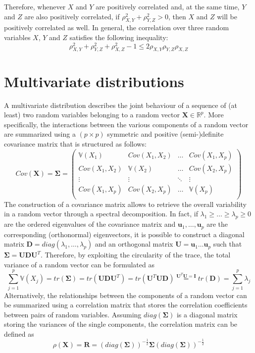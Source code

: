 \documentclass{report}
\begin{document}
\noindent Therefore, whenever $\displaystyle X$ and $\displaystyle Y$ are positively correlated and, at the same time, $\displaystyle Y$ and $\displaystyle Z$ are also positively correlated, if $\displaystyle \rho_{X, Y}^2 + \rho_{Y, Z}^2 > 0$, then $\displaystyle X$ and $\displaystyle Z$ will be positively correlated as well. \newline
In general, the correlation over three random variables $\displaystyle X$, $\displaystyle Y$ and $\displaystyle Z$ satisfies the following inequality:
\[\rho_{X, Y}^2 + \rho_{Y, Z}^2 + \rho_{X, Z}^2 - 1 \leq 2\rho_{X, Y}\rho_{Y, Z}\rho_{X, Z}\]
\section{Multivariate distributions}
A multivariate distribution describes the joint behaviour of a sequence of (at least) two random variables belonging to a random vector $\displaystyle \mathbf{X} \in \mathbb{R}^p$. \newline
More specifically, the interactions between the various components of a random vector are summarized using a $\displaystyle (p \times p)$ symmetric and positive (semi-)definite covariance matrix that is structured as follows:
\[Cov(\mathbf{X}) = \mathbf{\Sigma} = \begin{pmatrix}
    \mathbb{V}(X_1) & Cov(X_1, X_2) & \dots & Cov(X_1, X_p) \\
    Cov(X_1, X_2) & \mathbb{V}(X_2) & \dots & Cov(X_2, X_p) \\
    \vdots & \vdots & \ddots & \vdots \\
    Cov(X_1, X_p) & Cov(X_2, X_p) & \dots & \mathbb{V}(X_p) \\
\end{pmatrix}\]
The construction of a covariance matrix allows to retrieve the overall variability in a random vector through a spectral decomposition. \newline
In fact, if $\displaystyle \lambda_1 \ge \dots \ge \lambda_p \ge 0$ are the ordered eigenvalues of the covariance matrix and $\displaystyle \mathbf{u}_1, \dots, \mathbf{u}_p$ are the corresponding (orthonormal) eigenvectors, it is possible to construct a diagonal matrix $\displaystyle \mathbf{D} = diag(\lambda_1, \dots, \lambda_p)$ and an orthogonal matrix $\displaystyle \mathbf{U} = \mathbf{u}_1\dots\mathbf{u}_p$ such that $\displaystyle \mathbf{\Sigma} = \mathbf{UDU}^T$. \newline
Therefore, by exploiting the circularity of the trace, the total variance of a random vector can be formulated as
\[\sum_{j = 1}^p \mathbb{V}(X_j) = tr(\mathbf{\Sigma}) = tr(\mathbf{UDU}^T) = tr(\mathbf{U}^T\mathbf{UD}) \stackrel{\mathbf{U}^T\mathbf{U} = \mathbf{I}}{=} tr(\mathbf{D}) = \sum_{j = 1}^p \lambda_j\]
Alternatively, the relationships between the components of a random vector can be summarized using a correlation matrix that stores the correlation coefficients between pairs of random variables. \newline
Assuming $\displaystyle diag(\mathbf{\Sigma})$ is a diagonal matrix storing the variances of the single components, the correlation matrix can be defined as
\[\rho(\mathbf{X}) = \mathbf{R} = (diag(\mathbf{\Sigma}))^{-\frac{1}{2}}\mathbf{\Sigma}(diag(\mathbf{\Sigma}))^{-\frac{1}{2}}\]
\end{document}
